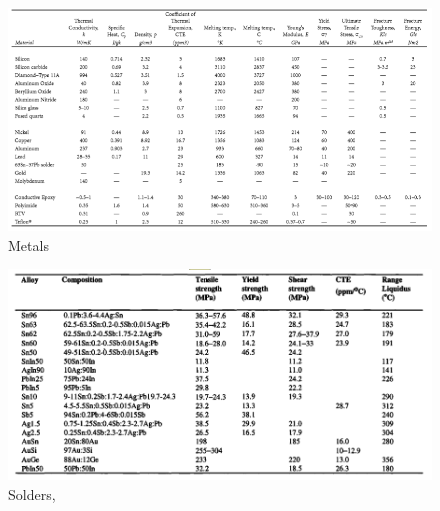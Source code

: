 \documentclass[final]{cubedoc}
\begin{document}
\begin{figure}[h!]
    \centering
    \includegraphics[keepaspectratio, height=.8\textheight, width=\textwidth]{docs/blackwell_prope.png}
    \caption{Metals \cite[p.526]{blackwell2017electronic}}
    \label{fig:copper_alloys}
\end{figure}

\begin{figure}[h!]
    \centering
    \includegraphics[keepaspectratio, height=.8\textheight, width=\textwidth]{docs/soldes.png}
    \caption{Solders, \cite[p.53]{pecht1998electronic}}
    \label{fig:copper_alloys}
\end{figure}

\clearpage



\end{document}
